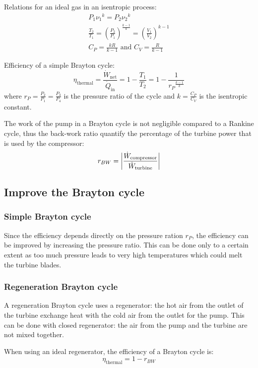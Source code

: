 \documentclass[10pt, twocolumn]{article}
\begin{document}
Relations for an ideal gas in an isentropic process:
\begin{gather}\label{eq:ideal-gas-isentropic-process}
  P_1{\nu_1}^k = P_2{\nu_2}^k                                                                                 \\
  \frac{T_2}{T_1} = \left( \frac{P_2}{P_1} \right)^{\frac{k - 1}{k}} = \left( \frac{V_1}{V_2} \right)^{k - 1} \nonumber\\
  C_P = \frac{kR}{k - 1} \text{ and } C_V = \frac{R}{k - 1} \nonumber
\end{gather}

Efficiency of a simple Brayton cycle:
\[
  \eta_\mathrm{thermal} = \frac{\dot{W}_\mathrm{net}}{\dot{Q}_\mathrm{in}} = 1 - \frac{T_1}{T_2} = 1 - \frac{1}{{r_P }^{\frac{k - 1}{k}}}
\]
where \(r_P = \frac{P_2}{P_1} = \frac{P_3}{P_4}\) is the pressure ratio of the cycle and \(k= \frac{C_P}{C_V}\) is the isentropic constant.

The work of the pump in a Brayton cycle is not negligible compared to a Rankine cycle, thus the back-work ratio quantify the percentage of the turbine power that is used by the compressor:
\[
  r_{BW} = \left| \frac{\dot{W}_\mathrm{compressor}}{\dot{W}_\mathrm{turbine}} \right|
\]



\subsection{Improve the Brayton cycle}
\subsubsection{Simple Brayton cycle}
Since the efficiency depends directly on the pressure ration \(r_P\), the efficiency can be improved by increasing the pressure ratio.
This can be done only to a certain extent as too much pressure leads to very high temperatures which could melt the turbine blades.


\subsubsection{Regeneration Brayton cycle}
A regeneration Brayton cycle uses a regenerator: the hot air from the outlet of the turbine exchange heat with the cold air from the outlet for the pump.
This can be done with closed regenerator: the air from the pump and the turbine are not mixed together.

When using an ideal regenerator, the efficiency of a Brayton cycle is:
\[
  \eta_\mathrm{thermal} = 1 - r_{BW}
\]
\end{document}
